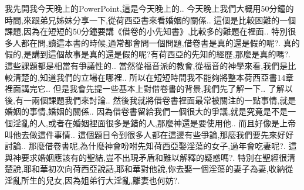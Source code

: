 \documentclass{book}
\begin{document}
我先開我今天晚上的PowerPoint,這是今天晚上的..
今天晚上我們大概用50分鐘的時間,來跟弟兄姊妹分享一下,從荷西亞書來看婚姻的關係..
這個是比較困難的一個課題,因為在短短的50分鐘要講《借卷的小先知書》,比較多的難題在裡面..
特別很多人都在問,讀這本書的時候,通常都會問一個問題,借卷書是真的還是假的呢?.
真的假的,是講到這個故事是真的還是假的呢?有荷西亞的先知的經歷,那麼是真的嗎?.
這些課題都是相當有爭議性的..
當然從福音派的教會,從福音的神學來看,我們是比較清楚的,知道我們的立場在哪裡..
所以在短短時間我不能夠將整本荷西亞書14章裡面講完它..
但是我會先提一些基本上對借卷書的背景,我們先了解一下..
了解以後,有一兩個課題我們來討論..
然後我就將借卷書裡面最常被關注的一點事情,就是婚姻的事情,婚姻的關係..
因為借卷書留給我們一個很大的爭議,就是究竟是不是一個淫亂的人,或者在婚姻裡面很多是錯的人,那麼神還是要使用他..
而且好像是上帝叫他去做這件事情..
這個題目令到很多人都在這邊有些爭論,那麼我們要先來好好討論..
那麼借卷書呢,為什麼神會吩咐先知荷西亞娶淫蕩的女子,過年會吃妻呢?.
這與神要求婚姻應該有的聖結,豈不出現矛盾和難以解釋的疑惑嗎?.
特別在聖經很清楚說,耶和華初次向荷西亞說話,耶和華對他說,你去娶一個淫蕩的妻子為妻,收納從淫亂所生的兒女,因為姐弟行大淫亂,離妻也何妨?.
\end{document}

